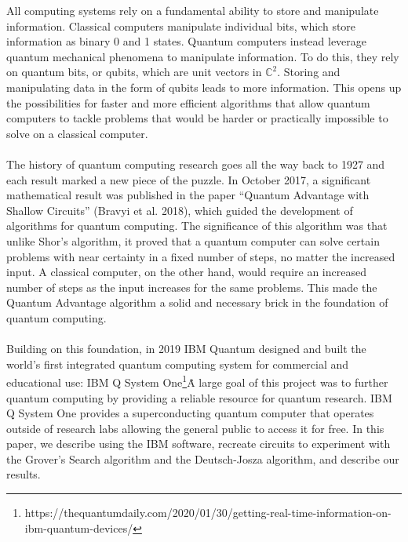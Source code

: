 \documentclass[12pt]{article}
\newcommand{\ibm}{\footnote{https://thequantumdaily.com/2020/01/30/getting-real-time-information-on-ibm-quantum-devices/}}
\begin{document}
    
    \noindent
    All computing systems rely on a fundamental ability to store and manipulate information. Classical computers manipulate individual bits, which store information as binary 0 and 1 states. Quantum computers instead leverage quantum mechanical phenomena to manipulate information. To do this, they rely on quantum bits, or qubits, which are unit vectors in $\mathbb{C}^2$. Storing and manipulating data in the form of qubits leads to more information. This opens up the possibilities for faster and more efficient algorithms that allow quantum computers to tackle problems that would be harder or practically impossible to solve on a classical computer.
    \\
    \smallskip
    \\
    The history of quantum computing research goes all the way back to 1927 and each result marked a new piece of the puzzle. In October 2017, a significant mathematical result was published in the paper “Quantum Advantage with Shallow Circuits” (Bravyi et al. 2018), which guided the development of algorithms for quantum computing. The significance of this algorithm was that unlike Shor’s algorithm, it proved that a quantum computer can solve certain problems with near certainty in a fixed number of steps, no matter the increased input. A classical computer, on the other hand, would require an increased number of steps as the input increases for the same problems. This made the Quantum Advantage algorithm a solid and necessary brick in the foundation of quantum computing.
    \\
    \smallskip
    \\
    Building on this foundation, in 2019 IBM Quantum designed and built the world’s first integrated quantum computing system for commercial and educational use: IBM Q System One\ibm\. A large goal of this project was to further quantum computing by providing a reliable resource for quantum research. IBM Q System One provides a superconducting quantum computer that operates outside of research labs allowing the general public to access it for free. In this paper, we describe using the IBM software, recreate circuits to experiment with the Grover’s Search algorithm and the Deutsch-Josza algorithm, and describe our results.
\end{document}
